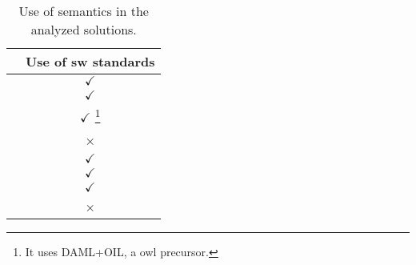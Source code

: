\begin{savenotes}
  \begin{table}[htbp]
    \caption{Use of semantics in the analyzed solutions.}
    \centering
    \begin{tabular}{ l c }
      \hline 
      & Use of \ac{sw} standards \\
      \hline 
      \midtsc{} & $\checkmark$ \\
      \midsws{} & $\checkmark$ \\
      \midstuples{} & $\checkmark$ \footnote{It uses DAML+OIL, a \ac{owl} precursor.} \\
      \midcspaces{} & × \\
      \midtscpp{} & $\checkmark$ \\
      \midtripcom{} & $\checkmark$ \\
      \midsmartmt{} & $\checkmark$ \\
      \midnardini{} & × \\
      \hline 
    \end{tabular}
    \label{tab:semantics_comparison}
  \end{table}
\end{savenotes}

